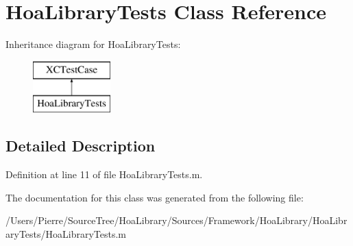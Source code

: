 \hypertarget{interface_hoa_library_tests}{\section{Hoa\-Library\-Tests Class Reference}
\label{interface_hoa_library_tests}
}
Inheritance diagram for Hoa\-Library\-Tests\-:\begin{figure}[H]
\begin{center}
\leavevmode
\includegraphics[height=2.000000cm]{interface_hoa_library_tests}
\end{center}
\end{figure}


\subsection{Detailed Description}


Definition at line 11 of file Hoa\-Library\-Tests.\-m.



The documentation for this class was generated from the following file\-:\begin{DoxyCompactItemize}
\item 
/\-Users/\-Pierre/\-Source\-Tree/\-Hoa\-Library/\-Sources/\-Framework/\-Hoa\-Library/\-Hoa\-Library\-Tests/Hoa\-Library\-Tests.\-m\end{DoxyCompactItemize}
